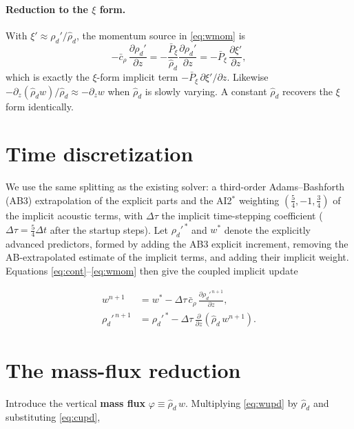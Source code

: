 \documentclass[11pt, oneside]{article}   	%
\begin{document}
\paragraph{Reduction to the $\xi$ form.} With $\xi' \approx \rho_d'/\hat{\rho}_d$, the
momentum source in \eqref{eq:wmom} is
\begin{equation}
-\bar{c}_\rho\,\frac{\partial \rho_d'}{\partial z}
   = -\frac{\bar{P}_\xi}{\hat{\rho}_d}\frac{\partial \rho_d'}{\partial z}
   = -\bar{P}_\xi\,\frac{\partial \xi'}{\partial z} ,
\end{equation}
which is exactly the $\xi$-form implicit term $-\bar{P}_\xi\,\partial \xi'/\partial z$.
Likewise $-\partial_z(\hat{\rho}_d w)/\hat{\rho}_d \approx -\partial_z w$ when
$\hat{\rho}_d$ is slowly varying. A constant $\hat{\rho}_d$ recovers the $\xi$ form
identically.

\section{Time discretization}

We use the same splitting as the existing solver: a third-order Adams--Bashforth (AB3)
extrapolation of the explicit parts and the AI2$^\ast$ weighting
$\left(\tfrac{5}{4}, -1, \tfrac{3}{4}\right)$ of the implicit acoustic terms, with
$\Delta\tau$ the implicit time-stepping coefficient ($\Delta\tau = \tfrac{5}{4}\Delta t$
after the startup steps). Let $\rho_d'^{\,*}$ and $w^{*}$ denote the explicitly
advanced predictors, formed by adding the AB3 explicit increment, removing the
AB-extrapolated estimate of the implicit terms, and adding their implicit weight.
Equations \eqref{eq:cont}--\eqref{eq:wmom} then give the coupled implicit update

\begin{align}
w^{n+1} &= w^{*} - \Delta\tau\,\bar{c}_\rho\,\frac{\partial \rho_d'^{\,n+1}}{\partial z} ,
   \label{eq:wupd} \\
\rho_d'^{\,n+1} &= \rho_d'^{\,*}
   - \Delta\tau\,\frac{\partial}{\partial z}\left(\hat{\rho}_d\, w^{n+1}\right) .
   \label{eq:cupd}
\end{align}

\section{The mass-flux reduction}

Introduce the vertical \textbf{mass flux} $\varphi \equiv \hat{\rho}_d\, w$. Multiplying
\eqref{eq:wupd} by $\hat{\rho}_d$ and substituting \eqref{eq:cupd},
\end{document}
